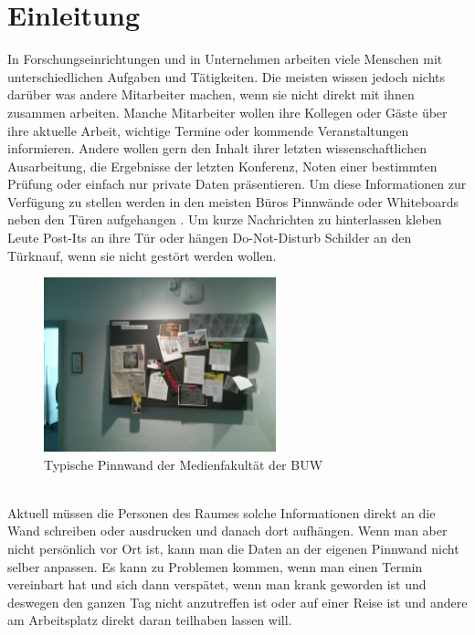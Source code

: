 \chapter{Einleitung}\label{Einleitung}
In Forschungseinrichtungen und in Unternehmen arbeiten viele Menschen mit unterschiedlichen Aufgaben und Tätigkeiten.
Die meisten wissen jedoch nichts darüber was andere Mitarbeiter machen, wenn sie nicht direkt mit ihnen zusammen arbeiten.
Manche Mitarbeiter wollen ihre Kollegen oder Gäste über ihre aktuelle Arbeit, wichtige Termine oder kommende Veranstaltungen informieren.
Andere wollen gern den Inhalt ihrer letzten wissenschaftlichen Ausarbeitung, die Ergebnisse der letzten Konferenz, Noten einer bestimmten Prüfung oder einfach nur private Daten präsentieren.
Um diese Informationen zur Verfügung zu stellen werden in den meisten Büros Pinnwände oder Whiteboards neben den Türen aufgehangen . Um kurze Nachrichten zu hinterlassen kleben Leute Post-Its an ihre Tür oder hängen Do-Not-Disturb Schilder an den Türknauf, wenn sie nicht gestört werden wollen.
\\
\begin{figure}[h!]
  \centering
    \includegraphics[width=0.6\textwidth]{./img/pinnwand.jpg}
  \caption{Typische Pinnwand der Medienfakultät der BUW}
  \label{img:pinnwand}
\end{figure}
\\
Aktuell müssen die Personen des Raumes solche Informationen direkt an die Wand schreiben oder ausdrucken und danach dort aufhängen.
Wenn man aber nicht persönlich vor Ort ist, kann man die Daten an der eigenen Pinnwand nicht selber anpassen.
Es kann zu Problemen kommen, wenn man einen Termin vereinbart hat und sich dann verspätet, wenn man krank geworden ist und deswegen den ganzen Tag nicht anzutreffen ist oder auf einer Reise ist und andere am Arbeitsplatz direkt daran teilhaben lassen will.
\\
